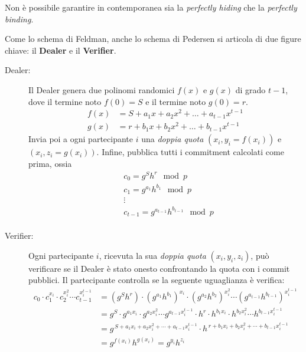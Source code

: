 \documentclass[a4paper, 11pt]{article}
\begin{document}
\newpage
\begin{tcolorbox}[title=Nota, colback=red!5, colframe=red!50!black, fonttitle=\bfseries]
Non è possibile garantire in contemporanea sia la \textit{perfectly hiding} che la \textit{perfectly binding}.
\end{tcolorbox}

Come lo schema di Feldman, anche lo schema di Pedersen si articola di due figure chiave: il \textbf{Dealer} e il \textbf{Verifier}.

\begin{description}
    \item[Dealer:] Il Dealer genera due polinomi randomici $f(x)$ e $g(x)$ di grado $t-1$, dove il termine noto $f(0) = S$ e il termine noto $g(0) = r$. 
    \begin{align*}
        f(x) &= S + a_1x + a_2x^2 + \dots + a_{t-1}x^{t-1}\\        
        g(x) &= r + b_1x + b_2x^2 + \dots + b_{t-1}x^{t-1}   
    \end{align*}
    Invia poi a ogni partecipante $i$ una \textit{doppia quota} $(x_i, y_i = f(x_i))$ e $(x_i, z_i = g(x_i))$. Infine, pubblica tutti i commitment calcolati come prima, ossia
    \begin{align*}
        &c_0 = g^Sh^r \mod p \\
        &c_1 = g^{a_1}h^{b_1} \mod p \\
        &\vdots \\
        &c_{t-1} = g^{a_{t-1}}h^{b_{t-1}} \mod p \\
    \end{align*}
    \item[Verifier:] Ogni partecipante $i$, ricevuta la sua \textit{doppia quota} $(x_i, y_i, z_i)$, può verificare se il Dealer è stato onesto confrontando la quota con i commit pubblici. Il partecipante controlla se la seguente uguaglianza è verifica:
    \begin{align*}
        c_0 \cdot c_1^{x_i} \cdot c_2^{x_i^2} \cdots c_{t-1}^{x_i^{t-1}} &= (g^Sh^r) \cdot (g^{a_1}h^{b_1})^{x_i} \cdot (g^{a_2}h^{b_2})^{x_i^2} \cdots (g^{a_{t-1}}h^{b_{t-1}})^{x_i^{t-1}} \\
        &= g^S \cdot g^{a_1 x_i} \cdot g^{a_2 x_i^2} \cdots g^{a_{t-1} x_i^{t-1}} \cdot h^r \cdot h^{b_1 x_i} \cdot h^{b_2 x_i^2} \cdots h^{b_{t-1} x_i^{t-1}} \\
        &= g^{\,S + a_1 x_i + a_2 x_i^2 + \cdots + a_{t-1} x_i^{t-1}} \cdot h^{\,r + b_1 x_i + b_2 x_i^2 + \cdots + b_{t-1} x_i^{t-1}}\\
        &= g^{f(x_i)}h^{g(x_i)} = g^{y_i}h^{z_i}
    \end{align*}
\end{description}
\end{document}
